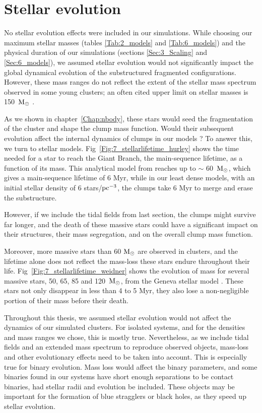 \section{Stellar evolution}





No stellar evolution effects were included in our simulations. While choosing our maximum stellar masses (tables \ref{Tab:2_models} and \ref{Tab:6_models}) and the physical duration of our simulations (sections \ref{Sec:3_Scaling} and \ref{Sec:6_models}), we assumed stellar evolution would not significantly impact the global dynamical evolution of the substructured fragmented configurations. However, these mass ranges do not reflect the extent of the stellar mass spectrum observed in some young clusters; an often cited upper limit on stellar masses is 150~${\textrm{M}_\odot}$ \citep{Oey2005}.

As we shown in chapter~\ref{Chap:nbody}, these stars would seed the fragmentation of the cluster and shape the clump mass function. Would their subsequent evolution affect the internal dynamics of clumps in our models ? To answer this, we turn to stellar models. Fig~\ref{Fig:7_stellarlifetime_hurley} shows the time needed for a star to reach the Giant Branch, the main-sequence lifetime, as a function of its mass. This analytical model from \cite{Hurley2000} reaches up to $\sim$ 60~${\textrm{M}_\odot}$, which gives a main-sequence lifetime of 6 Myr, while in our least dense models, with an initial stellar density of 6 stars/${\textrm{pc}}^{-3}$, the clumps take 6 Myr to merge and erase the substructure.

However, if we include the tidal fields from last section, the clumps might survive far longer, and the death of these massive stars could have a significant impact on their structures, their mass segregation, and  on the overall clump mass function.

Moreover, more massive stars than 60 ${\textrm{M}_\odot}$ are observed in clusters, and the lifetime alone does not reflect the mass-loss these stars endure throughout their life. Fig~\ref{Fig:7_stellarlifetime_weidner} shows the evolution of mass for several massive stars, 50, 65, 85 and 120~${\textrm{M}_\odot}$, from the Geneva stellar model \citep{Schaller1992}. These stars not only disappear in less than 4 to 5 Myr, they also lose a non-negligible portion of their mass before their death.

Throughout this thesis, we assumed stellar evolution would not affect the dynamics of our simulated clusters. For isolated systems, and for the densities and mass ranges we chose, this is mostly true. Nevertheless, as we include tidal fields and an extended mass spectrum to reproduce observed objects, mass-loss and other evolutionary effects need to be taken into account. This is especially true for binary evolution. Mass loss would affect the binary parameters, and some binaries found in our systems have short enough separations to be contact binaries, had stellar radii and evolution be included. These objects may be important for the formation of blue stragglers or black holes, as they speed up stellar evolution.

